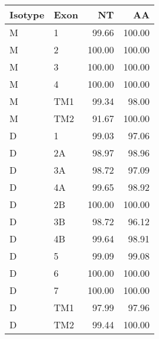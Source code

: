 \begin{tabular}{llrr}
  \toprule Isotype & Exon & NT & AA \\ 
  \midrule M & 1 & 99.66 & 100.00 \\ 
  M & 2 & 100.00 & 100.00 \\ 
  M & 3 & 100.00 & 100.00 \\ 
  M & 4 & 100.00 & 100.00 \\ 
  M & TM1 & 99.34 & 98.00 \\ 
  M & TM2 & 91.67 & 100.00 \\ 
  D & 1 & 99.03 & 97.06 \\ 
  D & 2A & 98.97 & 98.96 \\ 
  D & 3A & 98.72 & 97.09 \\ 
  D & 4A & 99.65 & 98.92 \\ 
  D & 2B & 100.00 & 100.00 \\ 
  D & 3B & 98.72 & 96.12 \\ 
  D & 4B & 99.64 & 98.91 \\ 
  D & 5 & 99.09 & 99.08 \\ 
  D & 6 & 100.00 & 100.00 \\ 
  D & 7 & 100.00 & 100.00 \\ 
  D & TM1 & 97.99 & 97.96 \\ 
  D & TM2 & 99.44 & 100.00 \\ 
   \bottomrule \end{tabular}

